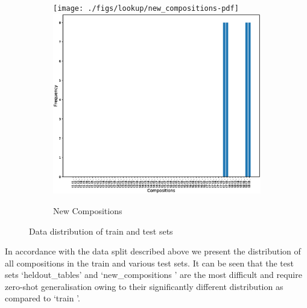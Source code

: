 \begin{figure}[ht]
\begin{subfigure}{0.5\linewidth}
		\ifpdf
		\texttt{[image: ./figs/lookup/new\_compositions-pdf]}
		\else
		\includegraphics[width=0.95\linewidth]{./figs/lookup/new_compositions-eps}
		\fi
		\caption{New Compositions}\label{fig:new_comp}
	\end{subfigure}
	\caption{Data distribution of train and test sets}\label{fig:all_data}
\end{figure}
In accordance with the data split described above we present the distribution of all compositions in the train and various test sets. It can be seen that the test sets \lq heldout\_tables\rq{} and \lq new\_compositions \rq{} are the most difficult and require zero-shot generalisation owing to their significantly different distribution as compared to \lq train \rq{}.

